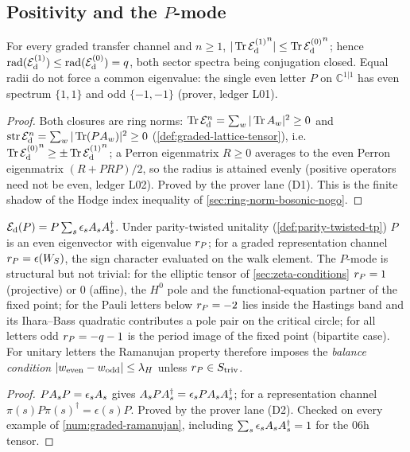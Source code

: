 \subsection{Positivity and the $P$-mode}

\begin{proposition}
\label{prop:graded-weil-hodge}
For every graded transfer channel and $n\ge1$, $|\operatorname{Tr}{\mathcal E_{\mathrm d}^{(1)}}^n|\le\operatorname{Tr}{\mathcal E_{\mathrm d}^{(0)}}^n$; hence
$\operatorname{rad}({\mathcal E_{\mathrm d}^{(1)}})\le\operatorname{rad}({\mathcal E_{\mathrm d}^{(0)}}) = q$, both sector spectra being conjugation closed.
Equal radii do not force a common eigenvalue: the single even letter $P$ on $\mathbb C^{1|1}$ has
even spectrum $\{1,1\}$ and odd $\{-1,-1\}$ (prover, ledger L01).
\end{proposition}
\begin{proof}
Both closures are ring norms: $\operatorname{Tr}\mathcal E_{\mathrm d}^n = \sum_w|\operatorname{Tr}A_{w}|^2\ge0$ and $\operatorname{str}\mathcal E_{\mathrm d}^n =
\sum_w|\operatorname{Tr}(PA_{w})|^2\ge0$ (\cref{def:graded-lattice-tensor}), i.e.\ $\operatorname{Tr}{\mathcal E_{\mathrm d}^{(0)}}^n\ge\pm\operatorname{Tr}
{\mathcal E_{\mathrm d}^{(1)}}^n$; a Perron eigenmatrix $R\ge0$ averages to the even Perron eigenmatrix $(R+PRP)/2$,
so the radius is attained evenly (positive operators need not be even, ledger L02). Proved by the
prover lane (D1). This is the finite shadow of the Hodge index inequality of
\cref{sec:ring-norm-bosonic-nogo}.
\end{proof}

\begin{proposition}
\label{prop:p-mode}
$\mathcal E_{\mathrm d}(P) = P\sum_s\epsilon_sA_{s}A_{s}^\dagger$. Under parity-twisted unitality
(\cref{def:parity-twisted-tp}) $P$ is an even eigenvector with eigenvalue $r_{P}$; for a graded
representation channel $r_{P} = \epsilon(W_S)$, the sign character evaluated on the walk element.
The $P$-mode is structural but not trivial: for the elliptic tensor of \cref{sec:zeta-conditions}
$r_{P} = 1$ (projective) or $0$ (affine), the $H^0$ pole and the functional-equation partner of
the fixed point; for the Pauli letters below $r_{P} = -2$ lies inside the Hastings band and its
Ihara--Bass quadratic contributes a pole pair on the critical circle; for all letters odd
$r_{P} = -q-1$ is the period image of the fixed point (bipartite case). For unitary letters the
Ramanujan property therefore imposes the \emph{balance condition} $|w_{\mathrm{even}}-
w_{\mathrm{odd}}|\le\lambda_H$ unless $r_{P}\in S_{\mathrm{triv}}$.
\end{proposition}
\begin{proof}
$PA_{s}P = \epsilon_sA_{s}$ gives $A_{s}PA_{s}^\dagger = \epsilon_sPA_{s}A_{s}^\dagger$; for a
representation channel $\pi(s)P\pi(s)^\dagger = \epsilon(s)P$. Proved by the prover lane (D2).
Checked on every example of \cref{num:graded-ramanujan}, including
$\sum_s\epsilon_sA_{s}A_{s}^\dagger = 1$ for the 06h tensor.
\end{proof}

